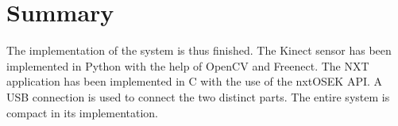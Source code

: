 \section{Summary}
The implementation of the system is thus finished. The Kinect sensor has been implemented in Python with the help of OpenCV and Freenect. The NXT application has been implemented in C with the use of the nxtOSEK API. A USB connection is used to connect the two distinct parts. The entire system is compact in its implementation.